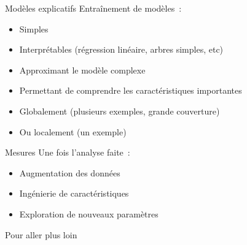 \begin{frame}{Modèles explicatifs}
  Entraînement de modèles~:
  \begin{itemize}
    \item Simples
    \item Interprétables (régression linéaire, arbres simples, etc)
    \item Approximant le modèle complexe
    \item Permettant de comprendre les caractéristiques importantes
    \item Globalement (plusieurs exemples, grande couverture)
    \item Ou localement (un exemple)
  \end{itemize}
\end{frame}

\begin{frame}{Mesures}
  Une fois l'analyse faite~:

  \begin{itemize}
    \item Augmentation des données
    \item Ingénierie de caractéristiques
    \item Exploration de nouveaux paramètres
  \end{itemize}
\end{frame}

\begin{frame}{Pour aller plus loin}
\end{frame}